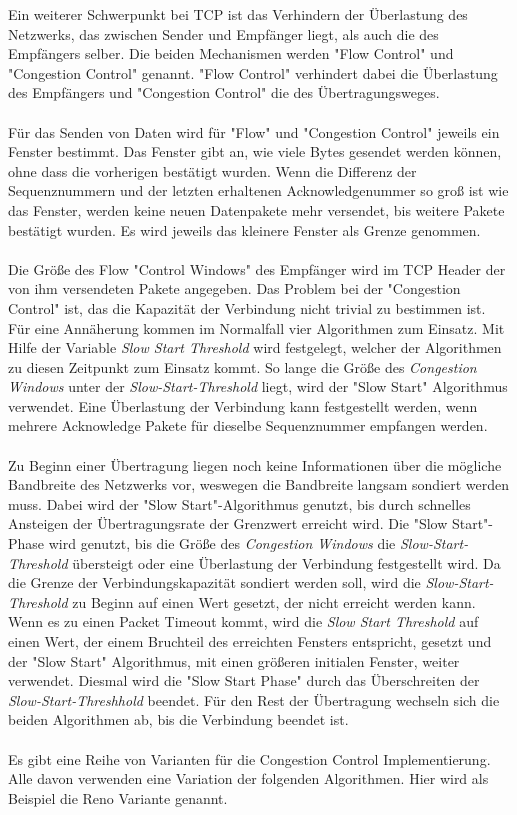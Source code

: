 Ein weiterer Schwerpunkt bei TCP ist das Verhindern der Überlastung des Netzwerks, das zwischen Sender und Empfänger liegt, als auch die des Empfängers selber. 
Die beiden Mechanismen werden "{}Flow Control"{} und "{}Congestion Control"{} genannt. 
{}"Flow Control{}" verhindert dabei die Überlastung des Empfängers und "{}Congestion Control{}" die des Übertragungsweges. \\\\
Für das Senden von Daten wird für "{}Flow"{} und "{}Congestion Control"{} jeweils ein Fenster bestimmt. Das Fenster gibt an, wie viele Bytes gesendet werden können, ohne dass die vorherigen bestätigt wurden. Wenn die Differenz der Sequenznummern und der letzten erhaltenen Acknowledgenummer so groß ist wie das Fenster, werden keine neuen Datenpakete mehr versendet, bis weitere Pakete bestätigt wurden. Es wird jeweils das kleinere Fenster als Grenze genommen. \\\\
Die Größe des Flow {}"Control Windows"{} des Empfänger wird im TCP Header der von ihm versendeten Pakete angegeben. 
Das Problem bei der "{}Congestion Control"{} ist, das die Kapazität der Verbindung nicht trivial zu bestimmen ist. Für eine Annäherung kommen im Normalfall vier Algorithmen zum Einsatz. Mit Hilfe der Variable \textit{Slow Start Threshold} wird festgelegt, welcher der Algorithmen zu diesen Zeitpunkt zum Einsatz kommt. So lange die Größe des \textit{Congestion Windows} unter der \textit{Slow-Start-Threshold} liegt, wird der "{}Slow Start"{} Algorithmus verwendet. Eine Überlastung der Verbindung kann festgestellt werden, wenn mehrere Acknowledge Pakete für dieselbe Sequenznummer empfangen werden.\\\\
Zu Beginn einer Übertragung liegen noch keine Informationen über die mögliche Bandbreite des Netzwerks vor, weswegen die Bandbreite langsam sondiert werden muss. Dabei wird der "{}Slow Start"{}-Algorithmus genutzt, bis durch schnelles Ansteigen der Übertragungsrate der Grenzwert erreicht wird. Die "{}Slow Start"{}-Phase wird genutzt, bis die Größe des \textit{Congestion Windows} die \textit{Slow-Start-Threshold} übersteigt oder eine Überlastung der Verbindung festgestellt wird. Da die Grenze der Verbindungskapazität sondiert werden soll, wird die \textit{Slow-Start-Threshold} zu Beginn auf einen Wert gesetzt, der nicht erreicht werden kann. Wenn es zu einen Packet Timeout kommt, wird die \textit{Slow Start Threshold} auf einen Wert, der einem Bruchteil des erreichten Fensters entspricht, gesetzt und der "{}Slow Start"{} Algorithmus, mit einen größeren initialen Fenster, weiter verwendet. Diesmal wird die "{}Slow Start Phase"{} durch das Überschreiten der \textit{Slow-Start-Threshhold} beendet. Für den Rest der Übertragung wechseln sich die beiden Algorithmen ab, bis die Verbindung beendet ist.\\\\
Es gibt eine Reihe von Varianten für die Congestion Control Implementierung. Alle davon verwenden eine Variation der folgenden Algorithmen. Hier wird als Beispiel die Reno Variante genannt.

